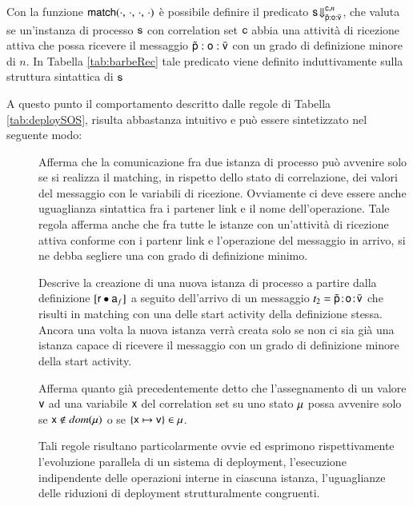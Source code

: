 Con la funzione  ${\sf match}(\cdot,\, \cdot,\, \cdot,\, \cdot)$ è
possibile definire il predicato
${\sf s}\!\Downarrow^{{\sf c},n}_{\tilde{{\sf p}}\,\! : \! \,{\sf o}\,\! : \! \,\bar{{\sf v}}}$,
che valuta se un'instanza di processo ${\sf s}$ con correlation set ${\sf c}$ abbia
una attività di ricezione attiva che possa ricevere il messaggio
$\tilde{{\sf p}}\,\! : \! \,{\sf o}\,\! : \! \,\bar{{\sf v}}$ con un grado di definizione
minore di $n$. In Tabella \ref{tab:barbeRec} tale predicato viene definito
induttivamente sulla struttura sintattica di ${\sf s}$

A questo punto il comportamento descritto dalle regole di Tabella
\ref{tab:deploySOS}, risulta abbastanza intuitivo e può essere sintetizzato nel
seguente modo:

\begin{description}
\item[] Afferma che la comunicazione fra due istanza di
 processo può avvenire solo se si realizza il matching, in rispetto dello stato
 di correlazione, dei valori del messaggio con le variabili di ricezione.
 Ovviamente ci deve essere anche uguaglianza sintattica fra i partener link e
 il nome dell'operazione. Tale regola afferma anche che fra tutte le istanze
 con un'attività di ricezione attiva conforme con i partenr link e l'operazione
 del messaggio in arrivo, si ne debba segliere una con grado di
 definizione minimo.
 \item[] Descrive la creazione di una nuova istanza di
 processo a partire dalla definizione $[{\sf r} \bullet {\sf a}_f]$ a seguito
 dell'arrivo di un messaggio $t_2 =
  \tilde{{\sf p}}\! : \! {\sf o}\! : \! \bar{{\sf v}}$ che risulti in matching con una delle start activity della
 definizione stessa. Ancora una volta la nuova istanza verrà creata solo se non
 ci sia già una istanza capace di ricevere il messaggio con un grado di
 definizione minore della start activity.
 \item[] Afferma quanto già precedentemente detto che
 l'assegnamento di un valore ${\sf v}$ ad una variabile ${\sf x}$ del correlation set
 su uno stato ${\sf \mu}$ possa avvenire solo se $ {\sf x} \notin dom({\sf \mu})$ o se $
 \{{\sf x} \mapsto {\sf v}\} \in {\sf \mu}$.
 \item[  ]
 Tali regole risultano particolarmente ovvie ed esprimono rispettivamente
 l'evoluzione parallela di un sistema di deployment, l'esecuzione
 indipendente delle operazioni interne in ciascuna istanza, l'uguaglianze delle
 riduzioni di deployment strutturalmente congruenti.
\end{description}

